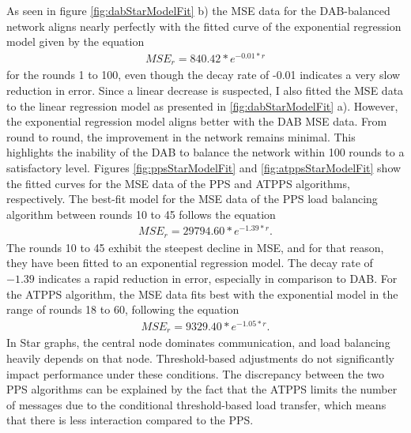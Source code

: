 As seen in figure \ref{fig:dabStarModelFit} b) the MSE data for the DAB-balanced network aligns nearly perfectly with the fitted curve of the exponential regression model given by the equation
\begin{align}
    MSE_r=840.42*e^{-0.01*r}    
\end{align}
for the rounds 1 to 100, even though the decay rate of -0.01 indicates a very slow reduction in error. Since a linear decrease is suspected, I also fitted the MSE data to the linear regression model as presented in \ref{fig:dabStarModelFit} a). However, the exponential regression model aligns better with the DAB MSE data. From round to round, the improvement in the network remains minimal. This highlights the inability of the DAB to balance the network within 100 rounds to a satisfactory level. Figures \ref{fig:ppsStarModelFit} and \ref{fig:atppsStarModelFit} show the fitted curves for the MSE data of the PPS and ATPPS algorithms, respectively. The best-fit model for the MSE data of the PPS load balancing algorithm between rounds 10 to 45 follows the equation
\begin{align}
    MSE_r=29794.60*e^{-1.39*r}.    
\end{align}
The rounds 10 to 45 exhibit the steepest decline in MSE, and for that reason, they have been fitted to an exponential regression model. The decay rate of $-1.39$ indicates a rapid reduction in error, especially in comparison to DAB. For the ATPPS algorithm, the MSE data fits best with the exponential model in the range of rounds 18 to 60, following the equation
\begin{align}
    MSE_r=9329.40*e^{-1.05*r}.    
\end{align}
In Star graphs, the central node dominates communication, and load balancing heavily depends on that node. Threshold-based adjustments do not significantly impact performance under these conditions. The discrepancy between the two PPS algorithms can be explained by the fact that the ATPPS limits the number of messages due to the conditional threshold-based load transfer, which means that there is less interaction compared to the PPS.

